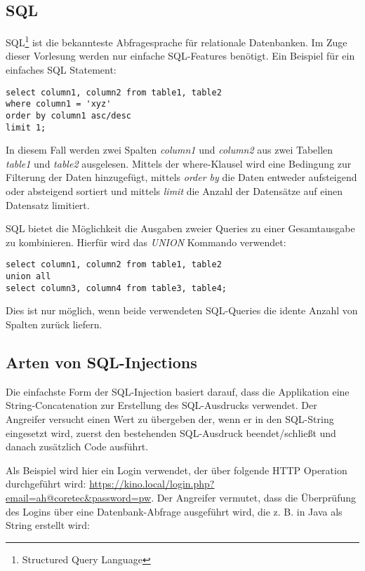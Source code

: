 \subsection{SQL}

SQL\footnote{Structured Query Language} ist die bekannteste Abfragesprache für relationale Datenbanken. Im Zuge dieser Vorlesung werden nur einfache SQL-Features benötigt. Ein Beispiel für ein einfaches SQL Statement:

\begin{verbatim}
select column1, column2 from table1, table2
where column1 = 'xyz'
order by column1 asc/desc
limit 1;
\end{verbatim}

In diesem Fall werden zwei Spalten \textit{column1} und \textit{column2} aus zwei Tabellen \textit{table1} und \textit{table2} ausgelesen. Mittels der where-Klausel wird eine Bedingung zur Filterung der Daten hinzugefügt, mittels \textit{order by} die Daten entweder aufsteigend oder absteigend sortiert und mittels \textit{limit} die Anzahl der Datensätze auf einen Datensatz limitiert.

SQL bietet die Möglichkeit die Ausgaben zweier Queries zu einer Gesamtausgabe zu kombinieren. Hierfür wird das \textit{UNION} Kommando verwendet:

\begin{verbatim}
select column1, column2 from table1, table2
union all
select column3, column4 from table3, table4;
\end{verbatim}

Dies ist nur möglich, wenn beide verwendeten SQL-Queries die idente Anzahl von Spalten zurück liefern.

\subsection{Arten von SQL-Injections}

Die einfachste Form der SQL-Injection basiert darauf, dass die Applikation eine String-Concatenation zur Erstellung des SQL-Ausdrucks verwendet. Der Angreifer versucht einen Wert zu übergeben der, wenn er in den SQL-String eingesetzt wird, zuerst den bestehenden SQL-Ausdruck beendet/schließt und danach zusätzlich Code ausführt.

Als Beispiel wird hier ein Login verwendet, der über folgende HTTP Operation durchgeführt wird: \url{https://kino.local/login.php?email=ah@coretec&password=pw}. Der Angreifer vermutet, dass die Überprüfung des Logins über eine Datenbank-Abfrage ausgeführt wird, die z. B. in Java als String erstellt wird:

